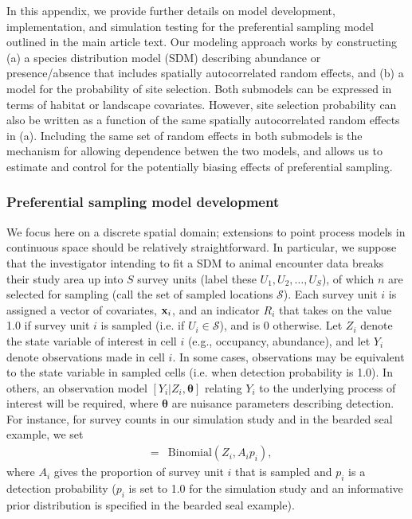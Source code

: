 \documentclass[times,mee,doublespace,]{besauth2}
\begin{document}
\begin{flushleft}

\raggedbottom

In this appendix, we provide further details on model development, implementation, and simulation testing for the preferential sampling model outlined in the main article text. Our modeling approach works by constructing (a) a species distribution model (SDM) describing abundance or presence/absence that includes spatially autocorrelated random effects, and (b) a model for the probability of site selection.  Both submodels can be expressed in terms of habitat or landscape covariates.  However, site selection probability can also be written as a function of the same spatially autocorrelated random effects in (a).  Including the same set of random effects in both submodels is the mechanism for allowing dependence betwen the two models, and allows us to estimate and control for the potentially biasing effects of preferential sampling.

\subsubsection*{Preferential sampling model development}

We focus here on a discrete spatial domain; extensions to point process models in continuous space should be relatively straightforward.  In particular, we suppose that the investigator intending to fit a SDM to animal encounter data breaks their study area up into $S$ survey units (label these $U_1, U_2, \hdots, U_S$), of which $n$ are selected for sampling (call the set of sampled locations $\mathcal{S}$).
Each survey unit $i$ is assigned a vector of covariates, ${\bf x}_i$, and an indicator $R_i$ that takes on the value 1.0 if survey unit $i$ is sampled (i.e. if $U_i \in \mathcal{S}$), and is 0 otherwise.  Let $Z_i$ denote the state variable of interest in cell $i$ (e.g., occupancy, abundance), and let $Y_i$ denote observations made in cell $i$.  In some cases, observations may be equivalent to the state variable in sampled cells (i.e. when detection probability is 1.0).  In others, an observation model $[Y_i | Z_i, \boldsymbol{\theta}]$ relating $Y_i$ to the underlying process of interest will be required, where $\boldsymbol{\theta}$ are nuisance parameters describing detection.  For instance, for survey counts in our simulation study and in the bearded seal example, we set
\begin{eqnarray*}
  [Y_i | Z_i, \boldsymbol{\theta}] & = & \textrm{Binomial}(Z_i, A_i p_i),
\end{eqnarray*}
where $A_i$ gives the proportion of survey unit $i$ that is sampled and $p_i$ is a detection probability ($p_i$ is set to 1.0 for the simulation study and an informative prior distribution is specified in the bearded seal example).


\end{flushleft}
\end{document}
